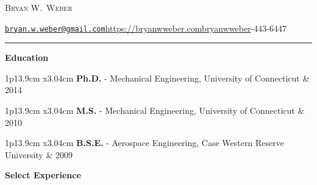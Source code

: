 \documentclass[11pt]{article}
\newcommand{\cvsection}[1]
{
\begin{center}
    \large\textcolor{sectcol}{\textbf{#1}}
\end{center}
}
\newcommand{\edevent}[3]
{
\begin{tabular*}{1\textwidth}{p{13.9cm} x{3.04cm}}%
    \textbf{#2} - \textcolor{bgcol}{#3} & \vspace{2.5pt}\textcolor{sectcol}{#1}%
\end{tabular*}

\vspace{-4pt}
}
\providecommand*\emaillink[1]{\nolinkurl{#1}}
\providecommand*\email[1]{\href{mailto:#1}{\emaillink{#1}}}
\begin{document}
\pagestyle{fancy}

\vspace{-8pt}
\begin{center}
    {\HUGE \textsc{Bryan W.\ Weber}}%

    \vspace{3pt}

    \email{bryan.w.weber@gmail.com}\enspace\textbullet\enspace\url{https://bryanwweber.com}\enspace\textbullet\enspace{}\enspace\href{https://github.com/bryanwweber}{bryanwweber}\enspace\textbullet{}-443-6447
\end{center}

\vspace{-12pt}
\textcolor{softcol}{\hrule}

\normalsize


\cvsection{Education}

\edevent{2014}{Ph.D.}{Mechanical Engineering, University of Connecticut}
\edevent{2010}{M.S.}{Mechanical Engineering, University of Connecticut}
\edevent{2009}{B.S.E.}{Aerospace Engineering, Case Western Reserve University}

\cvsection{Select Experience}
\end{document}
